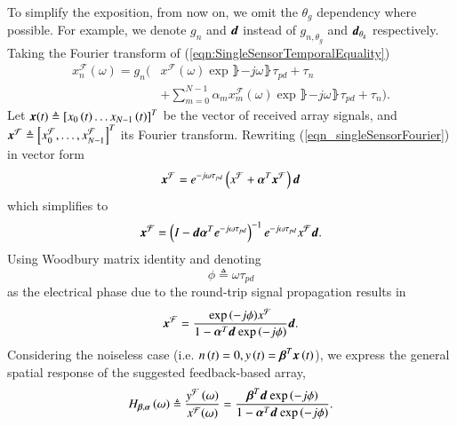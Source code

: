     To simplify the exposition, from now on, we omit the $\theta_{g}$ dependency where possible. For example, we denote $g_n$ and $\boldsymbol{d}$ instead of $g_{n,\theta_g}$ and $\boldsymbol{d}_{\theta_{g}}$ respectively. 
    Taking the Fourier transform of (\ref{eqn:SingleSensorTemporalEquality})
    \begin{equation}
        \label{eqn_singleSensorFourier}
            \begin{split}
                x_{n}^{\mathcal{F}}(\omega) =
                g_n\Bigg( & x^{\mathcal{F}}(\omega)
                \exp\rBrace{-j\omega\rBrace{\tau_{pd}+\tau_{n}}}
                \\&+\sum_{m=0}^{N-1}
                {
                \alpha_{m}x_{m}^{\mathcal{F}}(\omega)
                \exp\rBrace{-j\omega\rBrace{\tau_{pd}+\tau_{n}}}
                }\Bigg). 
            \end{split}
    \end{equation}
    Let $\boldsymbol{x}{\left({t}\right)}\triangleq\left[{x_{0}\left({t}\right)\hdots{}x_{N-1}\left({t}\right)}\right]^{T}$ be the vector of received array signals, and  $\boldsymbol{x}^{\mathcal{F}}\triangleq\left[{x_{0}^{\mathcal{F}},\hdots,x_{N-1}^{\mathcal{F}}}\right]^{T}$ its Fourier transform. Rewriting (\ref{eqn_singleSensorFourier}) in  vector form
    $$
    \boldsymbol{x}^{\mathcal{F}} = e^{-j\omega\tau_{pd}} \left({x^{\mathcal{F}}+\boldsymbol{\alpha}^{T} \boldsymbol{x}^{\mathcal{F}}}\right)\boldsymbol{d}
    $$
    which simplifies to
    $$
    \boldsymbol{x}^{\mathcal{F}} =\left({I-\boldsymbol{d}\boldsymbol{\alpha}^{T}{}e^{-j\omega\tau_{pd}}}\right)^{-1}e^{-j\omega\tau_{pd}}x^{\mathcal{F}} \boldsymbol{d} .
    $$
    Using Woodbury matrix identity \cite{woodbury1950inverting} and denoting
    \[
    \phi\triangleq\omega\tau_{pd}
    \]
    as the electrical phase due to the round-trip signal propagation results in
    $$
    \boldsymbol{x}^{\mathcal{F}}
    =
    \frac{    
    \exp{\left({-j\phi}\right)}x^{\mathcal{F}}
    }{
    1 - \boldsymbol{\alpha}^{T}\boldsymbol{d}_{}{}\exp{\left({-j\phi}\right)}
    }\boldsymbol{d}.
    $$
    Considering the noiseless case (i.e. $n\left({t}\right)=0, y\left({t}\right)=\boldsymbol{\beta}^{T}{}\boldsymbol{x}\left({t}\right)$),
    we express the general spatial response of the suggested feedback-based array, 
    \begin{equation}
    \label{eqn:GeneralFeedbackTransferFunction}
    H_{\vBeta,\vAlpha}\rBrace{\omega} 
    \triangleq
    \frac{y^{\mathcal{F}}\rBrace{\omega}}{x^{\mathcal{F}}(\omega)} 
    =
    \frac{    
    \bTd{}\exp\rBrace{-j\phi}
    }{
    1 - \aTd{}\exp\rBrace{-j\phi}
    }.
    \end{equation}
